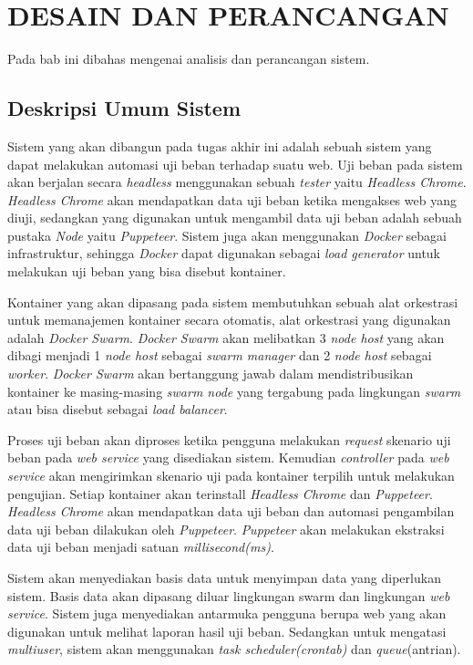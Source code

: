 \chapter{DESAIN DAN PERANCANGAN}
    Pada bab ini dibahas mengenai analisis dan perancangan sistem.
    
    \section{Deskripsi Umum Sistem}
    	\indent Sistem yang akan dibangun pada tugas akhir ini adalah sebuah sistem yang dapat melakukan automasi uji beban terhadap suatu web. Uji beban pada sistem akan berjalan secara \textit{headless} menggunakan sebuah \textit{tester} yaitu \textit{Headless Chrome}. \textit{Headless Chrome} akan mendapatkan data uji beban ketika mengakses web yang diuji, sedangkan yang digunakan untuk mengambil data uji beban adalah sebuah pustaka \textit{Node} yaitu \textit{Puppeteer}. Sistem juga akan menggunakan \textit{Docker} sebagai infrastruktur, sehingga \textit{Docker} dapat digunakan sebagai \textit{load generator} untuk melakukan uji beban yang bisa disebut kontainer.
    	
    	\indent Kontainer yang akan dipasang pada sistem membutuhkan sebuah alat orkestrasi untuk memanajemen kontainer secara otomatis, alat orkestrasi yang digunakan adalah \textit{Docker Swarm}. \textit{Docker Swarm} akan melibatkan 3 \textit{node host} yang akan dibagi menjadi 1 \textit{node host} sebagai \textit{swarm manager} dan 2 \textit{node host} sebagai \textit{worker}. \textit{Docker Swarm} akan bertanggung jawab dalam mendistribusikan kontainer ke masing-masing \textit{swarm node} yang tergabung pada lingkungan \textit{swarm} atau bisa disebut sebagai \textit{load balancer}.
    	
    	\indent Proses uji beban akan diproses ketika pengguna melakukan \textit{request} skenario uji beban pada \textit{web service} yang disediakan sistem. Kemudian \textit{controller} pada \textit{web service} akan mengirimkan skenario uji pada kontainer terpilih untuk melakukan pengujian. Setiap kontainer akan terinstall \textit{Headless Chrome} dan \textit{Puppeteer}. \textit{Headless Chrome} akan mendapatkan data uji beban dan automasi pengambilan data uji beban dilakukan oleh \textit{Puppeteer}. \textit{Puppeteer} akan melakukan ekstraksi data uji beban menjadi satuan \textit{millisecond(ms)}. 
    	
    	\indent Sistem akan menyediakan basis data untuk menyimpan data yang diperlukan sistem. Basis data akan dipasang diluar lingkungan swarm dan lingkungan \textit{web service}. Sistem juga menyediakan antarmuka pengguna berupa web yang akan digunakan untuk melihat laporan hasil uji beban. Sedangkan untuk mengatasi \textit{multiuser}, sistem akan menggunakan \textit{task scheduler(crontab)} dan \textit{queue}(antrian).
    
